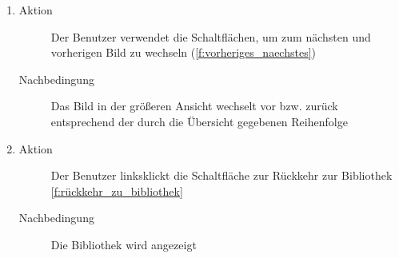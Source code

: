 \begin{enumerate} [label=\bfseries /TS \arabic*0/, leftmargin=*]
\begin{enumerate}[leftmargin=0pt]
\begin{description}
			\item[Nachbedingung] Das eben gewählte Bild wird in der vergrößerten Ansicht dargestellt; der gewählte Bildbereich wird angezeigt
		\end{description}
		\item
		\begin{description}
			\item[Aktion] Der Benutzer verwendet die Schaltflächen, um zum nächsten und vorherigen Bild zu wechseln (\ref{f:vorheriges_naechstes})
			\item[Nachbedingung] Das Bild in der größeren Ansicht wechselt vor bzw. zurück entsprechend der durch die Übersicht gegebenen Reihenfolge
		\end{description}
		\item
		\begin{description}
			\item[Aktion] Der Benutzer linksklickt die Schaltfläche zur Rückkehr zur Bibliothek \ref{f:rückkehr_zu_bibliothek}
			\item[Nachbedingung] Die Bibliothek wird angezeigt
		\end{description}
	\end{enumerate}


\end{enumerate}
